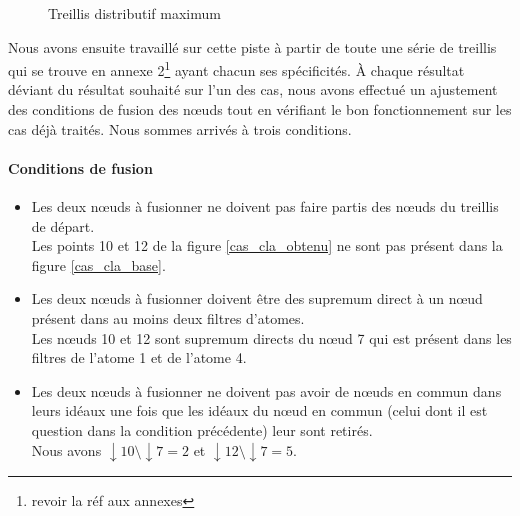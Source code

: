 \begin{figure}[H]
\begin{minipage}{0.5\textwidth}
\begin{center}
		\end{center}
		\caption{Treillis distributif maximum}
		\label{cas_cla_max}
	\end{minipage}
\end{figure}

Nous avons ensuite travaillé sur cette piste à partir de toute une série de treillis qui se trouve en annexe 2\footnote{revoir la réf aux annexes} ayant chacun ses spécificités. À chaque résultat déviant du résultat souhaité sur l'un des cas, nous avons effectué un ajustement des conditions de fusion des n\oe uds tout en vérifiant le bon fonctionnement sur les cas déjà traités. Nous sommes arrivés à trois conditions.

\paragraph*{Conditions de fusion}
\begin{itemize}
	\item Les deux n\oe uds à fusionner ne doivent pas faire partis des n\oe uds du treillis de départ.\\
	Les points 10 et 12 de la figure \ref{cas_cla_obtenu} ne sont pas présent dans la figure \ref{cas_cla_base}.
	\item Les deux n\oe uds à fusionner doivent être des supremum direct à un n\oe ud présent dans au moins deux filtres d'atomes.\\
	Les n\oe uds 10 et 12 sont supremum directs du n\oe ud 7 qui est présent dans les filtres de l'atome 1 et de l'atome 4.
	\item Les deux n\oe uds à fusionner ne doivent pas avoir de n\oe uds en commun dans leurs idéaux une fois que les idéaux du n\oe ud en commun (celui dont il est question dans la condition précédente) leur sont retirés.\\
	Nous avons $\downarrow \! 10 \setminus \downarrow \! 7 = {2}$ et $\downarrow \! 12 \setminus \downarrow \! 7 = {5}$.
\end{itemize}

